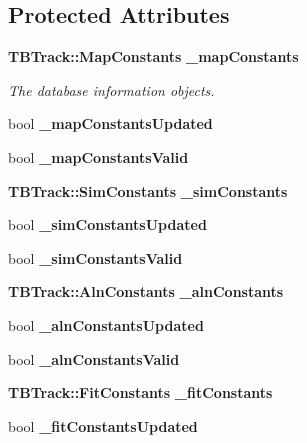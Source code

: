 \subsection*{Protected Attributes}
\begin{DoxyCompactItemize}
\item 
{\bf T\-B\-Track\-::\-Map\-Constants} {\bf \-\_\-map\-Constants}\label{classTBTrackBaseProcessor_aa3c3920945b6b96403927e68a4f2d597}

\begin{DoxyCompactList}\small\item\em The database information objects. \end{DoxyCompactList}\item 
bool {\bfseries \-\_\-map\-Constants\-Updated}\label{classTBTrackBaseProcessor_ac2ee432d8acdab0d231ae0b58f5d6e4b}

\item 
bool {\bfseries \-\_\-map\-Constants\-Valid}\label{classTBTrackBaseProcessor_ad88c3ed8dec6a87ff3a3eb028dbe2236}

\item 
{\bf T\-B\-Track\-::\-Sim\-Constants} {\bfseries \-\_\-sim\-Constants}\label{classTBTrackBaseProcessor_aaeccc8a3856c961bfb3a2e4628b18bd5}

\item 
bool {\bfseries \-\_\-sim\-Constants\-Updated}\label{classTBTrackBaseProcessor_afdb74aa9289c530800aa1d7c59501d76}

\item 
bool {\bfseries \-\_\-sim\-Constants\-Valid}\label{classTBTrackBaseProcessor_a8fb586fb8ea61ce5ec517eedc58e2f20}

\item 
{\bf T\-B\-Track\-::\-Aln\-Constants} {\bfseries \-\_\-aln\-Constants}\label{classTBTrackBaseProcessor_a294488d1364906fcd0c8f5ef18c014d0}

\item 
bool {\bfseries \-\_\-aln\-Constants\-Updated}\label{classTBTrackBaseProcessor_a42d1d55d0287df992de23ea462f85220}

\item 
bool {\bfseries \-\_\-aln\-Constants\-Valid}\label{classTBTrackBaseProcessor_a6e3b2ecf65ac15db4090a2c6c1b93f33}

\item 
{\bf T\-B\-Track\-::\-Fit\-Constants} {\bfseries \-\_\-fit\-Constants}\label{classTBTrackBaseProcessor_a36bd2bc7a54a8e8d2d19f03bb957a3d6}

\item 
bool {\bfseries \-\_\-fit\-Constants\-Updated}\label{classTBTrackBaseProcessor_a4b8278fd1ed9ff91f0a476cd84cdbce1}


\end{DoxyCompactItemize}
